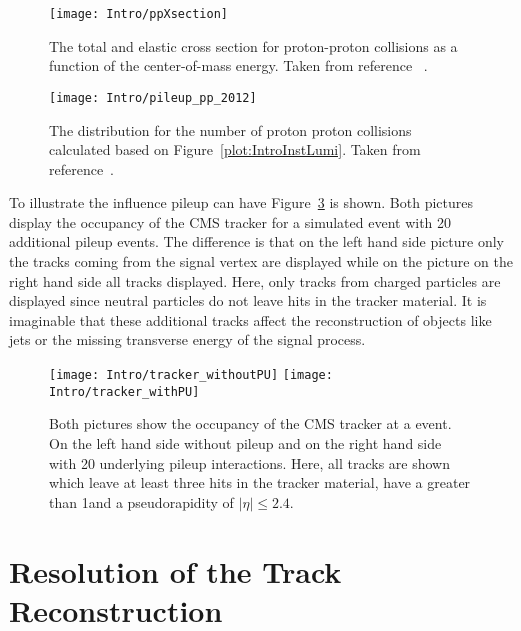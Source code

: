 \begin{figure}[!Hhtb]
  \centering
  \texttt{[image: Intro/ppXsection]}
  \caption[Total and elastic cross section for pp interactions]{The total and elastic cross section for proton-proton collisions as a function of the center-of-mass energy. Taken from reference ~.\label{plot:IntroTotalCross}}
\end{figure}

\begin{figure}[!Hhtb]
  \centering
  \texttt{[image: Intro/pileup\_pp\_2012]}
  \caption[Number of pp collisions]{The distribution for the number of proton proton collisions calculated based on Figure~\ref{plot:IntroInstLumi}. Taken from reference~. \label{plot:IntroPileupDistr}}
\end{figure}

To illustrate the influence pileup can have Figure~\ref{plot:IntroOccuTracker} is shown. Both pictures display the occupancy of the CMS tracker for a simulated \ttbar event with 20 additional pileup events. The difference is that on the left hand side picture only the tracks coming from the signal vertex are displayed while on the picture on the right hand side all tracks displayed. Here, only tracks from charged particles are displayed since neutral particles do not leave hits in the tracker material. It is imaginable that these additional tracks affect the reconstruction of objects like jets or the missing transverse energy of the signal process. 

\begin{figure}[!Hhtb]
  \centering
  \texttt{[image: Intro/tracker\_withoutPU]}
  \texttt{[image: Intro/tracker\_withPU]}
  \caption[Occupancy of the tracker with and without pileup]{Both pictures show the occupancy of the CMS tracker at a \ttbar event. On the left hand side without pileup and on the right hand side with 20 underlying pileup interactions. Here, all tracks are shown which leave at least three hits in the tracker material, have a \pt greater than 1\GeVc and a pseudorapidity of $\left|\eta\right|\leq2.4$. \label{plot:IntroOccuTracker}}
\end{figure}

\section{Resolution of the Track Reconstruction}


